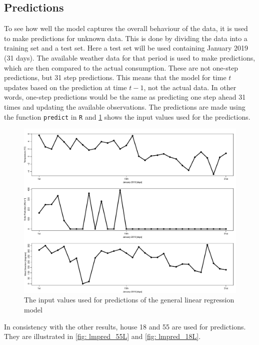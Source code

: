 \subsection{Predictions}
\noindent To see how well the model captures the overall behaviour of the data, it is used to make predictions for unknown data. This is done by dividing the data into a training set and a test set. Here a test set will be used containing January 2019 (31 days). The available weather data for that period is used to make predictions, which are then compared to the actual consumption. These are not one-step predictions, but 31 step predictions. This means that the model for time $t$ updates based on the prediction at time $t-1$, not the actual data. In other words, one-step predictions would be the same as predicting one step ahead 31 times and updating the available observations. The predictions are made using the function \texttt{predict} in \texttt{R} and \cref{fig: weather_pred} shows the input values used for the predictions.
\begin{figure}
    \centering
    \includegraphics[width=1.\textwidth]{../../../figures/weather_pred.pdf}
    \caption{The input values used for predictions of the general linear regression model}
    \label{fig: weather_pred}
\end{figure}
\noindent In consistency with the other results, house 18 and 55 are used for predictions. They are illustrated in \cref{fig: lmpred_55L} and \cref{fig: lmpred_18L}.
